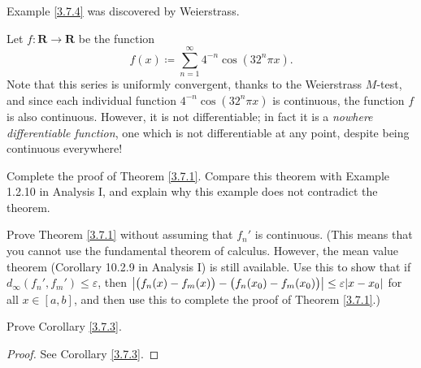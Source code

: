 \begin{note}
    Example \ref{3.7.4} was discovered by Weierstrass.
\end{note}

\begin{example}\label{3.7.4}
    Let \(f : \mathbf{R} \to \mathbf{R}\) be the function
    \[
        f(x) \coloneqq \sum_{n = 1}^\infty 4^{-n} \cos(32^n \pi x).
    \]
    Note that this series is uniformly convergent, thanks to the Weierstrass \(M\)-test, and since each individual function \(4^{-n} \cos(32^n \pi x)\) is continuous, the function \(f\) is also continuous.
    However, it is not differentiable;
    in fact it is a \emph{nowhere differentiable function}, one which is not differentiable at any point, despite being continuous everywhere!
\end{example}

\exercisesection

\begin{exercise}\label{ex 3.7.1}
    Complete the proof of Theorem \ref{3.7.1}.
    Compare this theorem with Example 1.2.10 in Analysis I, and explain why this example does not contradict the theorem.
\end{exercise}

\begin{exercise}\label{ex 3.7.2}
    Prove Theorem \ref{3.7.1} without assuming that \(f_n'\) is continuous.
    (This means that you cannot use the fundamental theorem of calculus.
    However, the mean value theorem (Corollary 10.2.9 in Analysis I) is still available.
    Use this to show that if \(d_\infty(f_n', f_m') \leq \varepsilon\), then \(\abs*{\big(f_n(x) - f_m(x)\big) - \big(f_n(x_0) - f_m(x_0)\big)} \leq \varepsilon \abs*{x - x_0}\) for all \(x \in [a, b]\), and then use this to complete the proof of Theorem \ref{3.7.1}.)
\end{exercise}

\begin{exercise}\label{ex 3.7.3}
    Prove Corollary \ref{3.7.3}.
\end{exercise}

\begin{proof}
    See Corollary \ref{3.7.3}.
\end{proof}